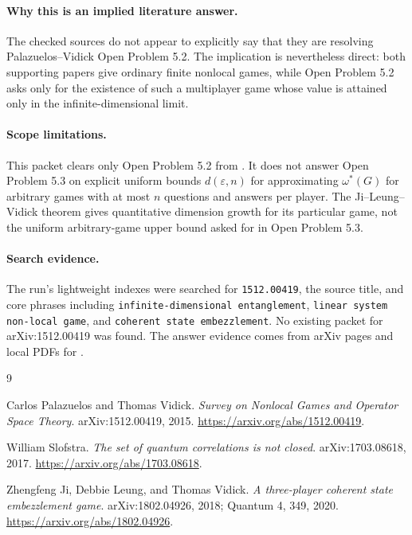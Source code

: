 \documentclass[11pt]{article}
\begin{document}
\paragraph{Why this is an implied literature answer.}
The checked sources do not appear to explicitly say that they are resolving
Palazuelos--Vidick Open Problem 5.2.  The implication is nevertheless direct:
both supporting papers give ordinary finite nonlocal games, while Open Problem
5.2 asks only for the existence of such a multiplayer game whose value is
attained only in the infinite-dimensional limit.

\paragraph{Scope limitations.}
This packet clears only Open Problem 5.2 from \cite{PVsurvey}.  It does not
answer Open Problem 5.3 on explicit uniform bounds $d(\varepsilon,n)$ for
approximating $\omega^*(G)$ for arbitrary games with at most $n$ questions and
answers per player.  The Ji--Leung--Vidick theorem gives quantitative dimension
growth for its particular game, not the uniform arbitrary-game upper bound
asked for in Open Problem 5.3.

\paragraph{Search evidence.}
The run's lightweight indexes were searched for \texttt{1512.00419}, the source
title, and core phrases including \texttt{infinite-dimensional entanglement},
\texttt{linear system non-local game}, and \texttt{coherent state embezzlement}.
No existing packet for arXiv:1512.00419 was found.  The answer evidence comes
from arXiv pages and local PDFs for \cite{Slofstra,JLV}.

\begin{thebibliography}{9}

Carlos Palazuelos and Thomas Vidick.
\newblock \emph{Survey on Nonlocal Games and Operator Space Theory}.
\newblock arXiv:1512.00419, 2015.
\newblock \url{https://arxiv.org/abs/1512.00419}.

William Slofstra.
\newblock \emph{The set of quantum correlations is not closed}.
\newblock arXiv:1703.08618, 2017.
\newblock \url{https://arxiv.org/abs/1703.08618}.

Zhengfeng Ji, Debbie Leung, and Thomas Vidick.
\newblock \emph{A three-player coherent state embezzlement game}.
\newblock arXiv:1802.04926, 2018; Quantum 4, 349, 2020.
\newblock \url{https://arxiv.org/abs/1802.04926}.

\end{thebibliography}
\end{document}
